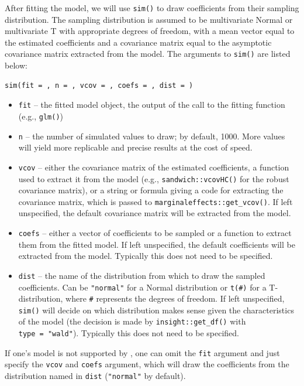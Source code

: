 After fitting the model, we will use \texttt{sim()} to draw coefficients from their sampling distribution. The sampling distribution is assumed to be multivariate Normal or multivariate T with appropriate degrees of freedom, with a mean vector equal to the estimated coefficients and a covariance matrix equal to the asymptotic covariance matrix extracted from the model. The arguments to \texttt{sim()} are listed below:

\begin{verbatim}
sim(fit = , n = , vcov = , coefs = , dist = )
\end{verbatim}

\begin{itemize}
\item
  \texttt{fit} -- the fitted model object, the output of the call to the fitting function (e.g., \texttt{glm()})
\item
  \texttt{n} -- the number of simulated values to draw; by default, 1000. More values will yield more replicable and precise results at the cost of speed.
\item
  \texttt{vcov} -- either the covariance matrix of the estimated coefficients, a function used to extract it from the model (e.g., \texttt{sandwich::vcovHC()} for the robust covariance matrix), or a string or formula giving a code for extracting the covariance matrix, which is passed to \texttt{marginaleffects::get\_vcov()}. If left unspecified, the default covariance matrix will be extracted from the model.
\item
  \texttt{coefs} -- either a vector of coefficients to be sampled or a function to extract them from the fitted model. If left unspecified, the default coefficients will be extracted from the model. Typically this does not need to be specified.
\item
  \texttt{dist} -- the name of the distribution from which to draw the sampled coefficients. Can be \texttt{"normal"} for a Normal distribution or \texttt{t(\#)} for a T-distribution, where \texttt{\#} represents the degrees of freedom. If left unspecified, \texttt{sim()} will decide on which distribution makes sense given the characteristics of the model (the decision is made by \texttt{insight::get\_df()} with \texttt{type\ =\ "wald"}). Typically this does not need to be specified.
\end{itemize}

If one's model is not supported by , one can omit the \texttt{fit} argument and just specify the \texttt{vcov} and \texttt{coefs} argument, which will draw the coefficients from the distribution named in \texttt{dist} (\texttt{"normal"} by default).

